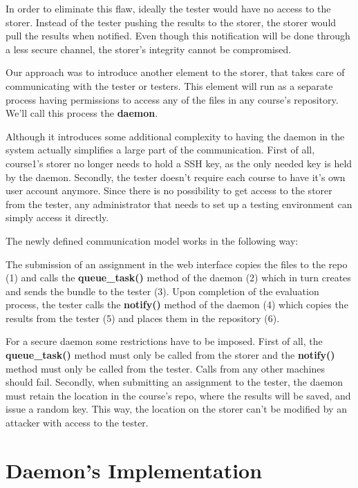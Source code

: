 In order to eliminate this flaw, ideally the tester would have no access to the
storer. Instead of the tester pushing the results to the storer, the storer
would pull the results when notified. Even though this notification will be done
through a less secure channel, the storer's integrity cannot be compromised.

Our approach was to introduce another element to the storer, that takes care
of communicating with the tester or testers. This element will run as a separate
process having permissions to access any of the files in any course's repository.
We'll call this process the \textbf{daemon}.

Although it introduces some additional complexity to 
having the daemon in the system actually simplifies a large part of the communication.
First of all, course1's storer no longer needs to hold a SSH key, as the only needed
key is held by the daemon. Secondly, the tester doesn't require each course to have
it's own user account anymore. Since there is no possibility to get access to the 
storer from the tester, any administrator that needs to set up a testing environment
can simply access it directly.

The newly defined communication model works in the following way:

The submission of an assignment in the web interface copies the files to the
repo (1) and calls the {\bf queue_task()} method of the daemon (2) which in turn
creates and sends the bundle to the tester (3).
Upon completion of the evaluation process, the tester calls the {\bf notify()}
method of the daemon (4) which copies the results from the tester (5)
and places them in the repository (6).

For a secure daemon some restrictions have to be imposed. First of all, the 
{\bf queue_task()} method must only be called from the storer and the
{\bf notify()} method must only be called from the tester. Calls from any other
machines should fail. Secondly, when submitting an assignment to the tester,
the daemon must retain the location in the course's repo, where the results will
be saved, and issue a random key. This way, the location on the storer can't be
modified by an attacker with access to the tester.


\begin{center}
\end{center}


\section{Daemon's Implementation}
\label{sec:vmc-daemon}

